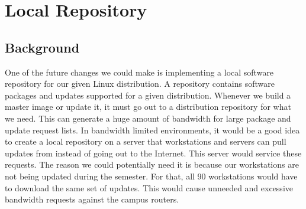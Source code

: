 \section{Local Repository}\label{sec:local_repository}
\subsection{Background}
One of the future changes we could make is implementing a local software repository for our given Linux distribution.  A repository contains software packages and updates supported for a given distribution.  Whenever we build a master image or update it, it must go out to a distribution repository for what we need.  This can generate a huge amount of bandwidth for large package and update request lists.  In bandwidth limited environments, it would be a good idea to create a local repository on a server that workstations and servers can pull updates from instead of going out to the Internet.  This server would service these requests.  The reason we could potentially need it is because our workstations are not being updated during the semester.  For that, all 90 workstations would have to download the same set of updates.  This would cause unneeded and excessive bandwidth requests against the campus routers.  
